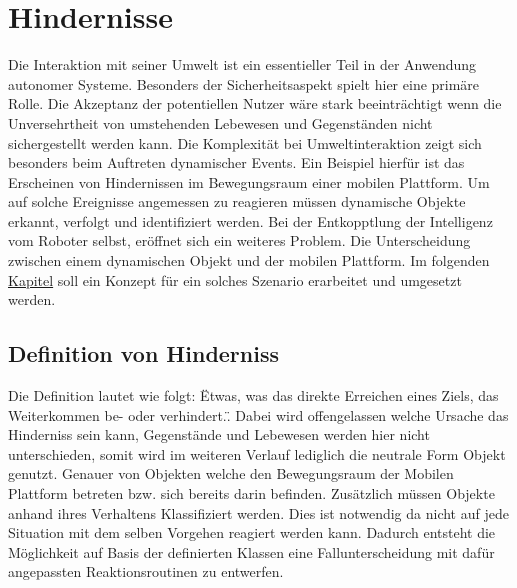
	\chapter{Hindernisse}
	Die Interaktion mit seiner Umwelt ist ein essentieller Teil in der Anwendung autonomer Systeme. Besonders der Sicherheitsaspekt spielt hier eine primäre Rolle. Die Akzeptanz der potentiellen Nutzer wäre stark beeinträchtigt wenn die Unversehrtheit von umstehenden Lebewesen und Gegenständen nicht sichergestellt werden kann. Die Komplexität bei Umweltinteraktion zeigt sich besonders beim Auftreten dynamischer Events. Ein Beispiel hierfür ist das Erscheinen von Hindernissen im Bewegungsraum einer mobilen Plattform. Um auf solche Ereignisse angemessen zu reagieren müssen dynamische Objekte erkannt, verfolgt und identifiziert werden. Bei der Entkopptlung der Intelligenz vom Roboter selbst, eröffnet sich ein weiteres Problem. Die Unterscheidung zwischen einem dynamischen Objekt und der mobilen Plattform. Im folgenden \underline{Kapitel} soll ein Konzept für ein solches Szenario erarbeitet und umgesetzt werden.
		\section{Definition von Hinderniss}
		Die Definition lautet wie folgt: \"Etwas, was das direkte Erreichen eines Ziels, das Weiterkommen be- oder verhindert.\". \cite{duden-hinderniss} Dabei wird offengelassen welche Ursache das Hinderniss sein kann, Gegenstände und Lebewesen werden hier nicht unterschieden, somit wird im weiteren Verlauf lediglich die neutrale Form Objekt genutzt. Genauer von Objekten welche den Bewegungsraum der Mobilen Plattform betreten bzw. sich bereits darin befinden. Zusätzlich müssen Objekte anhand ihres Verhaltens Klassifiziert werden. Dies ist notwendig da nicht auf jede Situation mit dem selben Vorgehen reagiert werden kann. Dadurch entsteht die Möglichkeit auf Basis der definierten Klassen eine Fallunterscheidung mit dafür angepassten Reaktionsroutinen zu entwerfen.
		
